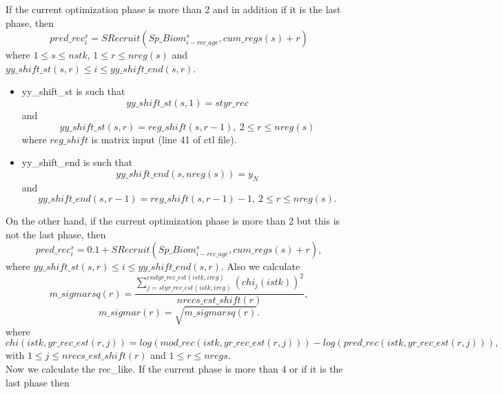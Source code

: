 \documentclass{article}
\begin{document}
If the current optimization phase is more than 2 and in addition if it is the last phase, then
\begin{equation}
    pred\_rec_{i}^s=SRecruit(Sp\_Biom^s_{i-rec\_age},cum\_regs(s)+r)
\end{equation}
where $1\leq s \leq nstk$, $1\leq r \leq nreg(s)$ and $yy\_shift\_st(s,r)\leq i \leq yy\_shift\_end(s,r)$.\\
\begin{itemize}
    \item yy\_shift\_st is such that $$yy\_shift\_st(s,1)=styr\_rec$$
    and
    \begin{equation*}
         yy\_shift\_st(s,r) = reg\_shift(s,r-1), \ 2\leq r \leq nreg(s)
    \end{equation*}
    where $reg\_shift$ is matrix input (line 41 of ctl file).
    \item yy\_shift\_end is such that
    \begin{equation*}
        yy\_shift\_end(s,nreg(s))= y_N
    \end{equation*}
    and
    \begin{equation*}
        yy\_shift\_end(s,r-1)=reg\_shift(s,r-1)-1, \ 2 \leq r \leq nreg(s).
    \end{equation*}
\end{itemize}

On the other hand, if the current optimization phase is more than 2 but this is not the last phase, then
\begin{equation}
    pred\_rec^s_i = 0.1+SRecruit(Sp\_Biom^s_{i-rec\_age},cum\_regs(s)+r),
\end{equation}
where $yy\_shift\_st(s,r)\leq i \leq yy\_shift\_end(s,r)$.
Also we calculate
\begin{equation}
    m\_sigmarsq(r)=\dfrac{\displaystyle\sum_{j=styr\_rec\_est(istk,ireg)}^{endyr\_rec\_est(istk,ireg)}(chi_j(istk))^2}{nrecs\_est\_shift(r)},
\end{equation}
\begin{equation}
    m\_sigmar(r)=\sqrt{m\_sigmarsq(r)}.
\end{equation}
where 
\begin{equation}
    chi(istk,yr\_rec\_est(r,j)) = log(mod\_rec(istk,yr\_rec\_est(r,j))) - log(pred\_rec(istk,yr\_rec\_est(r,j))),
\end{equation}
with $1\leq j \leq nrecs\_est\_shift(r)$ and $1\leq r \leq nregs.$\\

Now we calculate the rec\_like. If the current phase is more than 4 or if it is the last phase then
\end{document}

